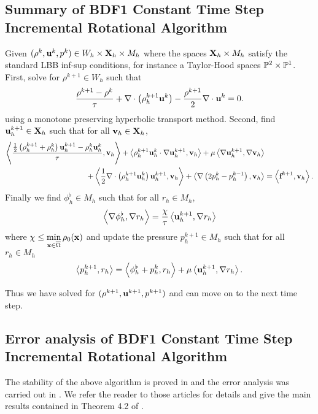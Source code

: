 \documentclass[letterpaper]{erdc}
\begin{document}
\subsection{Summary of BDF1 Constant Time Step Incremental Rotational Algorithm}\label{subsec:BDF1constantTimeSummary}
Given $(\rho^{k}, \textbf{u}^{k}, p^{k})\in W_h\times \textbf{X}_h\times M_h$ where the spaces $\textbf{X}_h\times M_h$ satisfy the standard LBB inf-sup conditions, for instance a Taylor-Hood spaces $\mathbb{P}^2\times\mathbb{P}^1$.   First, solve for $\rho^{k+1}\in W_h$ such that
\begin{equation}
  \frac{\rho^{k+1} - \rho^k}{\tau} + \nabla\cdot\left(\rho_h^{k+1}\textbf{u}^{k} \right) - \frac{\rho^{k+1}}{2}\nabla\cdot\textbf{u}^{k} = 0.
\end{equation}
using a monotone preserving hyperbolic transport method.  Second, find $\textbf{u}^{k+1}_h\in\textbf{X}_h$ such that for all $\textbf{v}_h\in\textbf{X}_h$,
\begin{equation}
  \begin{split}
\left\langle  \frac{\frac{1}{2}\left( \rho_h^{k+1} + \rho_h^{k} \right)\textbf{u}_h^{k+1}-\rho_h^{k}\textbf{u}_h^{k} }{\tau} , \textbf{v}_h \right\rangle + \left\langle  \rho_h^{k+1}\textbf{u}_h^{k}\cdot\nabla\textbf{u}_h^{k+1} , \textbf{v}_h \right\rangle + \mu\left\langle  \nabla \textbf{u}_h^{k+1} , \nabla\textbf{v}_h \right\rangle& \\
+ \left\langle  \frac{1}{2}\nabla\cdot\left(\rho_h^{k+1}\textbf{u}_h^{k}\right)\textbf{u}_h^{k+1} , \textbf{v}_h \right\rangle +\left\langle \nabla \left(2p_h^{k} - p_h^{k-1}\right), \textbf{v}_h \right\rangle &= \left\langle \textbf{f}^{k+1}, \textbf{v}_h \right\rangle.
\end{split}
\end{equation}
Finally we find $\phi_h^{\flat}\in M_h$ such that for all $r_h\in M_h$,
\begin{equation}
  \left\langle \nabla\phi_h^{\flat}, \nabla r_h \right\rangle = \frac{\chi}{\tau}\left\langle \textbf{u}_h^{k+1}, \nabla r_h \right\rangle
\end{equation}
where $\chi \leq \displaystyle\min_{\textbf{x}\in\overline{\Omega}}\rho_0(\textbf{x})$ and update the pressure $p_h^{k+1}\in M_h$ such that for all $r_h\in M_h$
\begin{equation}
  \left\langle p_h^{k+1}, r_h \right\rangle = \left\langle \phi_h^{\flat} + p_h^{k}, r_h \right\rangle + \mu\left\langle \textbf{u}_h^{k+1}, \nabla r_h \right\rangle.
\end{equation}

Thus we have solved for $(\rho^{k+1}, \textbf{u}^{k+1}, p^{k+1})$ and can move on to the next time step.


\subsection{Error analysis of BDF1 Constant Time Step Incremental Rotational Algorithm}
The stability of the above algorithm is proved in \cite{guermond2009splitting} and the error analysis was carried out in \cite{guermond2011error}.  We refer the reader to those articles for details and give the main results contained in Theorem 4.2 of \cite{guermond2011error}.
\end{document}
